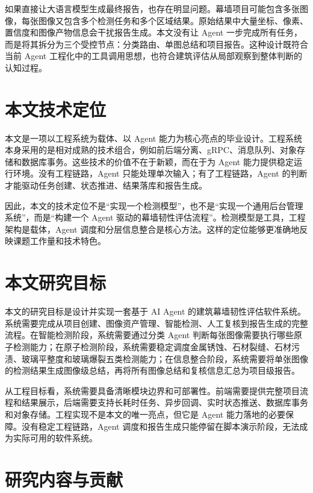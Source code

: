 如果直接让大语言模型生成最终报告，也存在明显问题。幕墙项目可能包含多张图像，每张图像又包含多个检测任务和多个区域结果。原始结果中大量坐标、像素、置信度和图像产物信息会干扰报告生成。本文没有让 Agent 一步完成所有任务，而是将其拆分为三个受控节点：分类路由、单图总结和项目报告。这种设计既符合当前 Agent 工程化中的工具调用思想，也符合建筑评估从局部观察到整体判断的认知过程。

\section{本文技术定位}
\label{sec:intro-position}

本文是一项以工程系统为载体、以 Agent 能力为核心亮点的毕业设计。工程系统本身采用的是相对成熟的技术组合，例如前后端分离、gRPC、消息队列、对象存储和数据库事务。这些技术的价值不在于新颖，而在于为 Agent 能力提供稳定运行环境。没有工程链路，Agent 只能处理单次输入；有了工程链路，Agent 的判断才能驱动任务创建、状态推进、结果落库和报告生成。

因此，本文的技术定位不是“实现一个检测模型”，也不是“实现一个通用后台管理系统”，而是“构建一个 Agent 驱动的幕墙韧性评估流程”。检测模型是工具，工程架构是载体，Agent 调度和分层信息整合是核心方法。这样的定位能够更准确地反映课题工作量和技术特色。

\section{本文研究目标}
\label{sec:intro-goal}

本文的研究目标是设计并实现一套基于 AI Agent 的建筑幕墙韧性评估软件系统。系统需要完成从项目创建、图像资产管理、智能检测、人工复核到报告生成的完整流程。在智能检测阶段，系统需要通过分类 Agent 判断每张图像需要执行哪些原子检测能力；在原子检测阶段，系统需要稳定调度金属锈蚀、石材裂缝、石材污渍、玻璃平整度和玻璃爆裂五类检测能力；在信息整合阶段，系统需要将单张图像的检测结果生成图像级总结，再将所有图像总结和复核信息汇总为项目级报告。

从工程目标看，系统需要具备清晰模块边界和可部署性。前端需要提供完整项目流程和结果展示，后端需要支持长耗时任务、异步回调、实时状态推送、数据库事务和对象存储。工程实现不是本文的唯一亮点，但它是 Agent 能力落地的必要保障。没有稳定工程链路，Agent 调度和报告生成只能停留在脚本演示阶段，无法成为实际可用的软件系统。

\section{研究内容与贡献}
\label{sec:intro-contribution}

